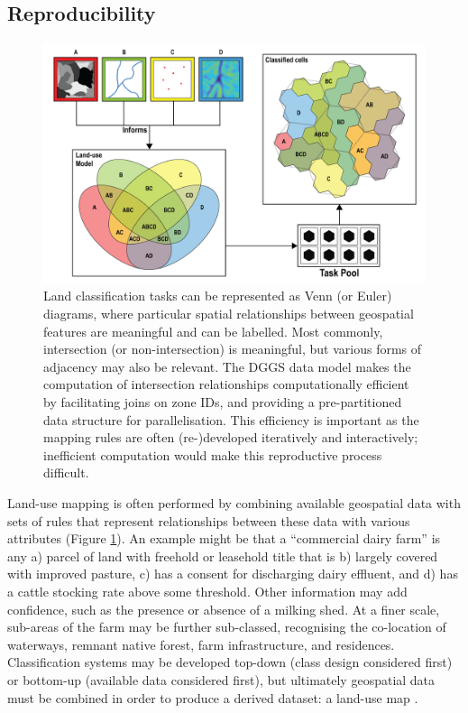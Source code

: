 \documentclass[]{interact}
\theoremstyle{plain}%
\theoremstyle{definition}
\theoremstyle{remark}
\begin{document}
\subsection{Reproducibility}

\begin{figure}[t]
    \centering
    \includegraphics[width=0.65\linewidth]{images/DGGS_lu-03.png}
    \caption{Land classification tasks can be represented as Venn (or Euler) diagrams, where particular spatial relationships between geospatial features are meaningful and can be labelled. Most commonly, intersection (or non-intersection) is meaningful, but various forms of adjacency may also be relevant. The \ac{DGGS} data model makes the computation of intersection relationships computationally efficient by facilitating joins on zone IDs, and providing a pre-partitioned data structure for parallelisation. This efficiency is important as the mapping rules are often (re-)developed iteratively and interactively; inefficient computation would make this reproductive process difficult.}
    \label{fig:Reproducible}
\end{figure}

Land-use mapping is often performed by combining available geospatial data with sets of rules that represent relationships between these data with various attributes (Figure \ref{fig:Reproducible}). An example might be that a ``commercial dairy farm'' is any a) parcel of land with freehold or leasehold title that is b) largely covered with improved pasture, c) has a consent for discharging dairy effluent, and d) has a cattle stocking rate above some threshold. Other information may add confidence, such as the presence or absence of a milking shed. At a finer scale, sub-areas of the farm may be further sub-classed, recognising the co-location of waterways, remnant native forest, farm infrastructure, and residences. Classification systems may be developed top-down (class design considered first) or bottom-up (available data considered first), but ultimately geospatial data must be combined in order to produce a derived dataset: a land-use map \citep{rutledge2009geospatial}.
\end{document}
